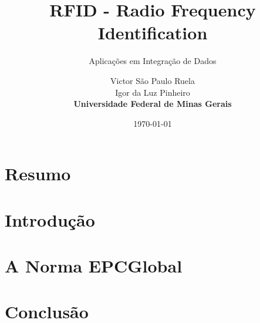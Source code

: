 \documentclass[a4paper,12pt,titlepage]{scrartcl}
\begin{document}
\title{RFID - Radio Frequency Identification}
\subtitle{Aplicações em Integração de Dados}
\author{Victor São Paulo Ruela \\ Igor da Luz Pinheiro \\ \textbf{Universidade Federal de Minas Gerais}}
\date{\today}

\maketitle

\tableofcontents
\newpage 
\listoffigures
\newpage
\listoftables
\newpage


\section{Resumo}
\section{Introdução}

\section{A Norma EPCGlobal}

\section{Conclusão}


\newpage

\nocite{*}

\end{document}
